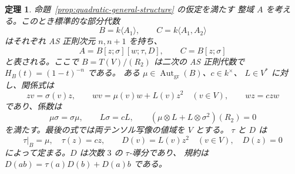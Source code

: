 \documentclass[11pt,a4paper]{ltjsarticle}
\newtheorem{theorem}{定理}[section]
\theoremstyle{definition}
\begin{document}
\begin{theorem}\label{thm:quadratic-all-ones}
命題~\ref{prop:quadratic-general-structure} の仮定を満たす
整域 $A$ を考える。このとき標準的な部分代数
\[
 B=k\langle A_1\rangle,\qquad C=k\langle A_1,A_2\rangle
\]
はそれぞれ AS 正則次元 $n,n+1$ を持ち、
\begin{equation}\label{eq:quadratic-all-ones-ore}
 A=B[z;\sigma][w;\tau,D],\qquad C=B[z;\sigma]
\end{equation}
と表される。ここで $B=T(V)/(R_2)$ は二次の AS 正則代数で
$H_B(t)=(1-t)^{-n}$ である。
ある $\mu\in\operatorname{Aut}_{\mathrm{gr}}(B)$、$c\in k^\times$、
$L\in V^*$ に対し、関係式は
\begin{equation}\label{eq:quadratic-all-ones-normal-form}
 zv=\sigma(v)z,\qquad
 wv=\mu(v)w+L(v)z^2\quad(v\in V),\qquad wz=c zw
\end{equation}
であり、係数は
\begin{equation}\label{eq:quadratic-all-ones-conditions}
 \mu\sigma=\sigma\mu,\qquad
 L\sigma=cL,\qquad
 (\mu\otimes L+L\otimes\sigma^2)(R_2)=0
\end{equation}
を満たす。最後の式では両テンソル写像の値域を $V$ とする。
$\tau$ と $D$ は
\[
 \tau|_B=\mu,\quad\tau(z)=cz,\qquad
 D(v)=L(v)z^2\quad(v\in V),\quad D(z)=0
\]
によって定まる。$D$ は次数 $3$ の $\tau$-導分であり、
規約は $D(ab)=\tau(a)D(b)+D(a)b$ である。

\end{theorem}
\end{document}
